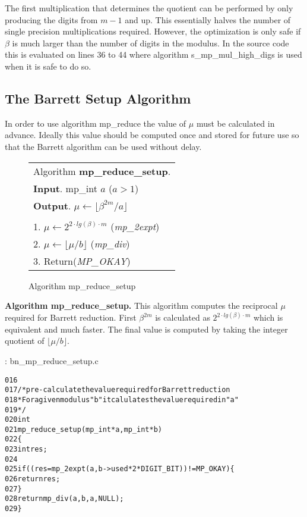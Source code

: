 \documentclass[b5paper]{book}
\begin{document}
The first multiplication that determines the quotient can be performed by only producing the digits from $m - 1$ and up.  This essentially halves
the number of single precision multiplications required.  However, the optimization is only safe if $\beta$ is much larger than the number of digits
in the modulus.  In the source code this is evaluated on lines 36 to 44 where algorithm s\_mp\_mul\_high\_digs is used when it is
safe to do so.  

\subsection{The Barrett Setup Algorithm}
In order to use algorithm mp\_reduce the value of $\mu$ must be calculated in advance.  Ideally this value should be computed once and stored for
future use so that the Barrett algorithm can be used without delay.  

\begin{figure}[!here]
\begin{small}
\begin{center}
\begin{tabular}{l}
\hline Algorithm \textbf{mp\_reduce\_setup}. \\
\textbf{Input}.   mp\_int $a$ ($a > 1$)  \\
\textbf{Output}.  $\mu \leftarrow \lfloor \beta^{2m}/a \rfloor$ \\
\hline \\
1.  $\mu \leftarrow 2^{2 \cdot lg(\beta) \cdot  m}$ (\textit{mp\_2expt}) \\
2.  $\mu \leftarrow \lfloor \mu / b \rfloor$ (\textit{mp\_div}) \\
3.  Return(\textit{MP\_OKAY}) \\
\hline
\end{tabular}
\end{center}
\end{small}
\caption{Algorithm mp\_reduce\_setup}
\end{figure}

\textbf{Algorithm mp\_reduce\_setup.}
This algorithm computes the reciprocal $\mu$ required for Barrett reduction.  First $\beta^{2m}$ is calculated as $2^{2 \cdot lg(\beta) \cdot  m}$ which
is equivalent and much faster.  The final value is computed by taking the integer quotient of $\lfloor \mu / b \rfloor$.

\vspace{+3mm}\begin{small}
\hspace{-5.1mm}{\bf File}: bn\_mp\_reduce\_setup.c
\vspace{-3mm}
\begin{alltt}
016   
017   /* pre-calculate the value required for Barrett reduction
018    * For a given modulus "b" it calulates the value required in "a"
019    */
020   int
021   mp_reduce_setup (mp_int * a, mp_int * b)
022   \{
023     int     res;
024     
025     if ((res = mp_2expt (a, b->used * 2 * DIGIT_BIT)) != MP_OKAY) \{
026       return res;
027     \}
028     return mp_div (a, b, a, NULL);
029   \}
\end{alltt}
\end{small}
\end{document}
